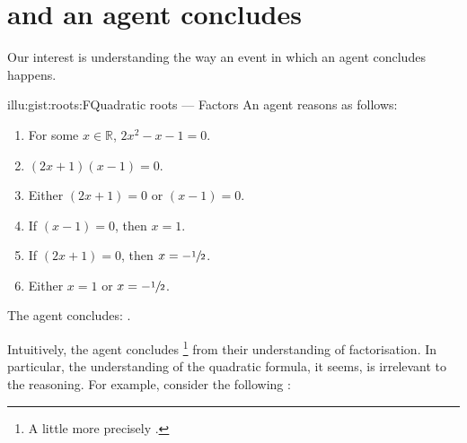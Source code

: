 \chapter{\qWhy{} and \qHow{} an agent concludes}
\label{cha:intro}


\begin{note}
  Our interest is understanding the way an event in which an agent concludes happens.

  \begin{rscenario}{illu:gist:roots:F}{Quadratic roots --- Factors}%
    An agent reasons as follows:
    \begin{enumerate}[label=\arabic*., ref=\arabic*]
    \item
      \label{illu:gist:roots:F:eq}
      For some \(x \in \mathbb{R}\), \(2x^{2} - x - 1 = 0\).
    \item
      \label{illu:gist:roots:F:factor}
      \((2x + 1)(x - 1) = 0\).%
    \item
      \label{illu:gist:roots:F:zero}
      Either \((2x + 1) = 0\) or \((x - 1) = 0\).%
    \item
      \label{illu:gist:roots:F:case:a}
      If \((x - 1) = 0\), then \(x = 1\).%
    \item
      \label{illu:gist:roots:F:case:b}
      If \((2x + 1) = 0\), then \(x = -\sfrac{1}{2}\).%
    \item
      \label{illu:gist:roots:F:factor:done}
      Either \(x = 1\) or \(x = -\sfrac{1}{2}\).%
    \end{enumerate}
    The agent concludes:
    \rootsCon{}.
  \end{rscenario}

  \noindent%
  Intuitively, the agent concludes \propI{\rootsCon{}}%
    \footnote{
      A little more precisely \rootsConFull{}.
    }
    from their understanding of factorisation.
  In particular, the \agents{} understanding of the quadratic formula, it seems, is irrelevant to the \agents{} reasoning.
  For example, consider the following :


\end{note}
